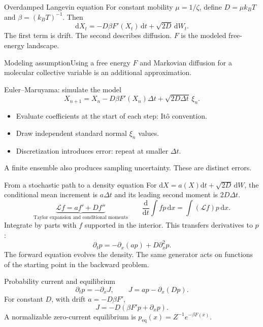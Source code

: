 \documentclass[aspectratio=169,10pt]{beamer}
\newcommand{\dd}{\mathrm{d}}
\begin{document}
\begin{frame}{Overdamped Langevin equation}
For constant mobility $\mu=1/\zeta$, define $D=\mu k_BT$ and $\beta=(k_BT)^{-1}$. Then
\[\boxed{\dd X_t=-D\beta F'(X_t)\,\dd t+\sqrt{2D}\,\dd W_t.}\]
The first term is drift. The second describes diffusion. $F$ is the modeled free-energy landscape.
\begin{block}{Modeling assumption}Using a free energy $F$ and Markovian diffusion for a molecular collective variable is an additional approximation.\end{block}
\end{frame}

\begin{frame}{Euler--Maruyama: simulate the model}
\[X_{n+1}=X_n-D\beta F'(X_n)\Delta t+\sqrt{2D\Delta t}\,\xi_n.\]
\begin{itemize}\item Evaluate coefficients at the start of each step: It\^o convention.\item Draw independent standard normal $\xi_n$ values.\item Discretization introduces error: repeat at smaller $\Delta t$.\end{itemize}
A finite ensemble also produces sampling uncertainty. These are distinct errors.
\end{frame}

\begin{frame}{From a stochastic path to a density equation}
For $\dd X=a(X)\dd t+\sqrt{2D}\,\dd W$, the conditional mean increment is $a\Delta t$ and its leading second moment is $2D\Delta t$.
\[
\underbrace{\mathcal L f=af'+Df''}_{\text{Taylor expansion and conditional moments}}
\qquad
\frac{\dd}{\dd t}\int fp\,\dd x=\int (\mathcal L f)p\,\dd x.
\]
Integrate by parts with $f$ supported in the interior. This transfers derivatives to $p$:
\[
\boxed{\partial_t p=-\partial_x(ap)+D\partial_x^2p.}
\]
The forward equation evolves the density. The same generator acts on functions of the starting point in the backward problem.
\end{frame}

\begin{frame}{Probability current and equilibrium}
\[\partial_t p=-\partial_xJ,\qquad J=ap-\partial_x(Dp).\]
For constant $D$, with drift $a=-D\beta F'$,
\[J=-D(\beta F'p+\partial_xp).\]
A normalizable zero-current equilibrium is $p_{\mathrm{eq}}(x)=Z^{-1}e^{-\beta F(x)}$.
\end{frame}
\end{document}
